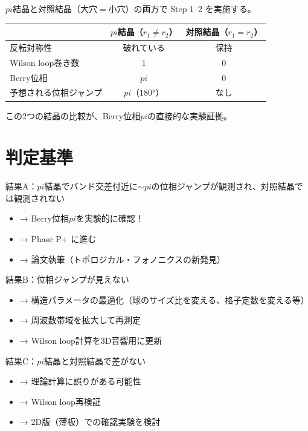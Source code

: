 \documentclass[11pt,a4paper]{article}
\def\pi{pi}%
\def\textbf#1{#1}%
\begin{document}
$\pi$結晶と対照結晶（大穴$=$小穴）の両方で Step 1--2 を実施する。

\begin{center}
\begin{tabular}{lcc}
\toprule
& $\pi$結晶（$r_1 \neq r_2$） & 対照結晶（$r_1 = r_2$） \\
\midrule
反転対称性 & 破れている & 保持 \\
Wilson loop巻き数 & 1 & 0 \\
Berry位相 & $\pi$ & $0$ \\
予想される位相ジャンプ & \textbf{$\pi$（180°）} & \textbf{なし} \\
\bottomrule
\end{tabular}
\end{center}

この2つの結晶の比較が、Berry位相$\pi$の\textbf{直接的な実験証拠}。


\section{判定基準}

\begin{tcolorbox}[colback=red!5,colframe=red!60!black,title=GO / STOP 判定]
\textbf{結果A：$\pi$結晶でバンド交差付近に$\sim\pi$の位相ジャンプが観測され、対照結晶では観測されない}
\begin{itemize}
\item → \textbf{Berry位相$\pi$を実験的に確認！}
\item → Phase P+ に進む
\item → 論文執筆（トポロジカル・フォノニクスの新発見）
\end{itemize}

\textbf{結果B：位相ジャンプが見えない}
\begin{itemize}
\item → 構造パラメータの最適化（球のサイズ比を変える、格子定数を変える等）
\item → 周波数帯域を拡大して再測定
\item → Wilson loop計算を3D音響用に更新
\end{itemize}

\textbf{結果C：$\pi$結晶と対照結晶で差がない}
\begin{itemize}
\item → 理論計算に誤りがある可能性
\item → Wilson loop再検証
\item → 2D版（薄板）での確認実験を検討
\end{itemize}
\end{tcolorbox}
\end{document}

